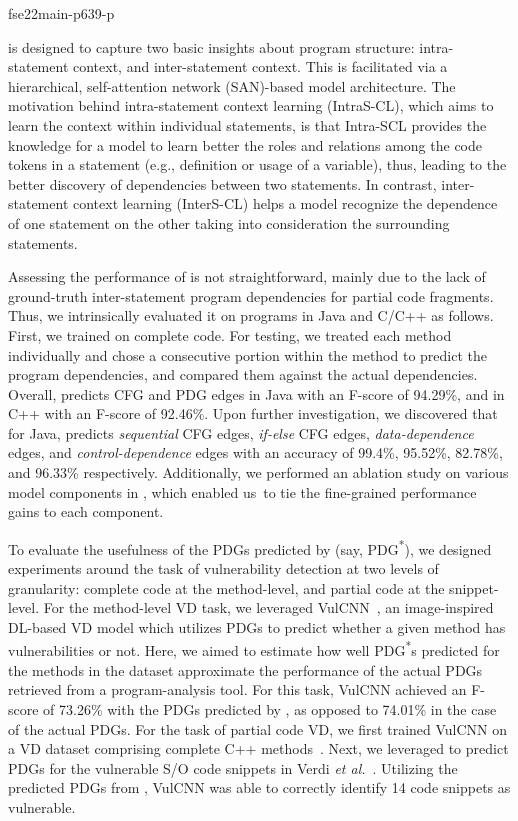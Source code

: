 fse22main-p639-p


\tool is designed to capture two basic insights about program
structure: intra-statement context, and inter-statement context. This
is facilitated via a hierarchical, self-attention network (SAN)-based
model architecture. The motivation behind intra-statement context
learning (IntraS-CL), which aims to learn the context within individual
statements, is that Intra-SCL provides the knowledge for a model to
learn better the roles and relations among the code tokens in a
statement (e.g., definition or usage of a variable), thus, leading
to the better discovery of dependencies between two statements. In contrast,
inter-statement context learning (InterS-CL) helps a 
model recognize the dependence of one statement on the other 
taking into consideration the surrounding statements.

Assessing the performance of {\tool} is not straightforward, mainly due
to the lack of ground-truth inter-statement program dependencies for
partial code fragments. Thus, we intrinsically evaluated it on
programs in Java and C/C++ as follows. First, we trained {\tool} on
complete code. For testing, we treated each method individually and
chose a consecutive portion within the method to predict the program
dependencies, and compared them against the actual
dependencies. Overall, \tool predicts CFG and PDG edges in Java with
an F-score of 94.29\%, and in C++ with an F-score of 92.46\%. Upon
further investigation, we discovered that for Java, \tool predicts
{\em sequential} CFG edges, \textit{if-else} CFG edges, {\em
data-dependence} edges, and {\em control-dependence} edges with an
accuracy of 99.4\%, 95.52\%, 82.78\%, and 96.33\%
respectively. Additionally, we performed an ablation study on various
model components in \tool, which enabled us~to tie the fine-grained
performance gains to each component.

To evaluate the usefulness of the PDGs predicted by \tool (say,
PDG\textsuperscript{*}), we designed experiments around the task of
vulnerability detection at two levels of granularity: complete code at
the method-level, and partial code at the snippet-level. For the
method-level VD task, we leveraged VulCNN~\cite{wu2022vulcnn}, an
image-inspired DL-based VD model which utilizes PDGs to predict
whether a given method has vulnerabilities or not. Here, we aimed to
estimate how well PDG\textsuperscript{*}s predicted for the methods in
the dataset approximate the performance of the actual PDGs retrieved
from a program-analysis tool. For this task, VulCNN achieved an
F-score of 73.26\% with the PDGs predicted by \tool, as opposed to
74.01\% in the case of the actual PDGs. For the task of partial code
VD, we first trained VulCNN on a VD dataset comprising complete C++
methods~\cite{fan2020msr}. Next, we leveraged \tool to predict PDGs
for the vulnerable S/O code snippets in Verdi {\em et
  al.}~\cite{verdi-tse22}. Utilizing the predicted PDGs from \tool,
VulCNN was able to correctly identify 14 code snippets as vulnerable.


